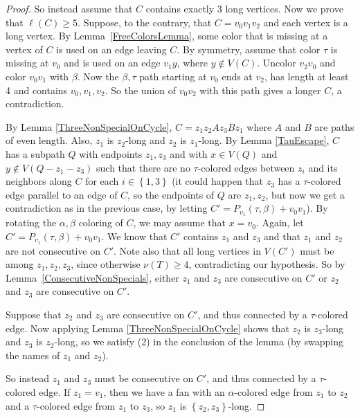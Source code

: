 \documentclass[12pt]{article}
\theoremstyle{plain}
\theoremstyle{definition}
\theoremstyle{remark}
\newcommand{\set}[1]{\left\{ #1 \right\}}
\begin{document}
\begin{proof}
So instead assume that $C$ contains exactly 3 long vertices. %
Now we prove that $\ell(C)\ge 5$.  Suppose, to the contrary, that $C=v_0v_1v_2$
and each vertex is a long vertex.  By Lemma~\ref{FreeColorsLemma}, some color
that is missing at a vertex of $C$ is used on an edge leaving $C$.  By
symmetry, assume that color $\tau$ is missing at $v_0$ and is used on an edge
$v_1y$, where $y\notin V(C)$.
Uncolor $v_2v_0$ and color $v_0v_1$ with $\beta$.   Now the $\beta,\tau$ path
starting at $v_0$ ends at $v_2$,  has length at least 4 and contains $v_0,
v_1, v_2$.  So the union of $v_0v_2$ with this path gives a longer $C$, a
contradiction.

By Lemma
\ref{ThreeNonSpecialOnCycle}, $C = z_1z_2Az_3Bz_1$ where $A$ and $B$ are paths
of even length.  Also, $z_1$ is $z_2$-long and $z_2$ is $z_1$-long.  
%
By Lemma \ref{TauEscape}, $C$ has a subpath $Q$ 
with endpoints $z_1,z_3$ and with $x \in V(Q)$ and $y \not
\in V(Q-z_1-z_3)$ 
such that there are no $\tau$-colored edges
between $z_i$ and its neighbors along $C$ for each $i \in \set{1,3}$ (it could
happen that $z_3$ has a $\tau$-colored edge parallel to an edge of $C$,
so the endpoints of $Q$ are $z_1, z_2$, but now we get a contradiction
as in the previous case, by letting $C'=P_{v_1}(\tau,\beta)+v_0v_1$).  By
rotating the $\alpha,\beta$ coloring of $C$, we
may assume that $x = v_0$.  Again, let $C' = P_{v_1}(\tau, \beta) + v_0v_1$.  We
know that $C'$ contains $z_1$ and $z_3$ and that $z_1$ and $z_2$ are not
consecutive on $C'$.  Note also that all long vertices in $V(C')$ must be among
$z_1,z_2,z_3$, since otherwise $\nu(T)\ge 4$, contradicting our hypothesis.
So by Lemma~\ref{ConsecutiveNonSpecials}, either $z_1$ and
$z_3$ are consecutive on $C'$ or $z_2$ and $z_3$ are consecutive on $C'$.

Suppose that $z_2$ and $z_3$ are consecutive on $C'$, and thus connected by a
$\tau$-colored edge.  Now applying Lemma \ref{ThreeNonSpecialOnCycle} shows that $z_2$
is $z_3$-long and $z_3$ is $z_2$-long, so we satisfy (2) in the conclusion of
the lemma (by swapping the names of $z_1$ and $z_2$).

So instead $z_1$ and $z_3$ must be consecutive on $C'$, and thus connected by a
$\tau$-colored edge.  If $z_1 = v_1$, then we have a fan with an
$\alpha$-colored edge from $z_1$ to $z_2$ and a $\tau$-colored edge from $z_1$
to $z_3$, so $z_1$ is $\set{z_2,z_3}$-long. 


\end{proof}
\end{document}
